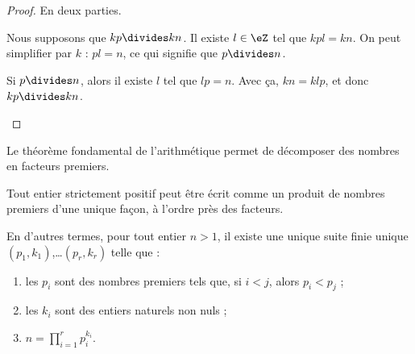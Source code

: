\begin{proof}
	En deux parties.
	\begin{subproof}
		\spitem[\( \Rightarrow\)]
		Nous supposons que \( kp\divides kn\). Il existe \( l\in \eZ\) tel que \( kpl=kn\). On peut simplifier par \( k\) : \( pl=n\), ce qui signifie que \( p\divides n\).

		\spitem[\( \Leftarrow\)]
		Si \( p\divides n\), alors il existe \( l\) tel que \( lp=n\). Avec ça, \( kn=klp\), et donc \( kp\divides kn\).
	\end{subproof}
\end{proof}

Le théorème fondamental de l'arithmétique permet de décomposer des nombres en facteurs premiers.

\begin{theorem}        \label{ThoAJFJooAveRvY}
	Tout entier strictement positif peut être écrit comme un produit de nombres premiers d'une unique façon, à l'ordre près des facteurs.

	En d'autres termes, pour tout entier \( n>1\), il existe une unique suite finie unique \( (p_1, k_1)\),\ldots \( (p_r, k_r)\) telle que :
	\begin{enumerate}
		\item
		      les \( p_i\) sont des nombres premiers tels que, si \( i < j\), alors \( p_i < p_j\) ;
		\item
		      les \( k_i\) sont des entiers naturels non nuls ;
		\item
		      \( n=\prod_{i=1}^rp_i^{k_i}\).
	\end{enumerate}
\end{theorem}

